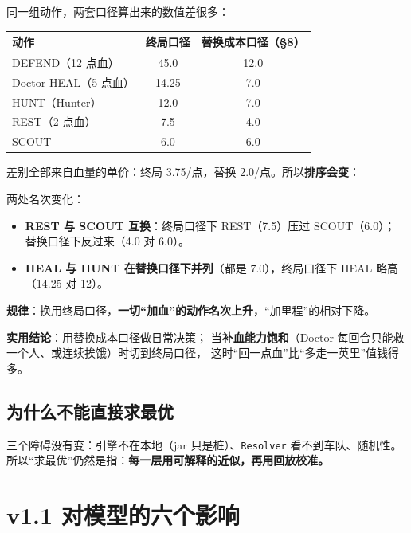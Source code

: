 \documentclass[UTF8,11pt,a4paper]{ctexart}
\begin{document}
\begin{warnbox}[title={口径不同，绝对值不同，排序也会变}]
同一组动作，两套口径算出来的数值差很多：

\begin{center}
\small
\begin{tabular}{@{}lcc@{}}
\toprule
\textbf{动作} & \textbf{终局口径} & \textbf{替换成本口径（§8）} \\
\midrule
DEFEND（12 点血） & 45.0 & 12.0 \\
Doctor HEAL（5 点血） & 14.25 & 7.0 \\
HUNT（Hunter） & 12.0 & 7.0 \\
REST（2 点血） & 7.5 & 4.0 \\
SCOUT & 6.0 & 6.0 \\
\bottomrule
\end{tabular}
\end{center}

\noindent 差别全部来自血量的单价：终局 3.75/点，替换 2.0/点。所以\textbf{排序会变}：

\noindent 两处名次变化：
\begin{itemize}[leftmargin=1.4em]
  \item \textbf{REST 与 SCOUT 互换}：终局口径下 REST（7.5）压过 SCOUT（6.0）；
        替换口径下反过来（4.0 对 6.0）。
  \item \textbf{HEAL 与 HUNT 在替换口径下并列}（都是 7.0），终局口径下 HEAL 略高（14.25 对 12）。
\end{itemize}
\textbf{规律}：换用终局口径，\textbf{一切“加血”的动作名次上升}，“加里程”的相对下降。

\textbf{实用结论}：用替换成本口径做日常决策；
当\textbf{补血能力饱和}（Doctor 每回合只能救一个人、或连续挨饿）时切到终局口径，
这时“回一点血”比“多走一英里”值钱得多。
\end{warnbox}

\subsection{为什么不能直接求最优}

三个障碍没有变：引擎不在本地（jar 只是桩）、\texttt{Resolver} 看不到车队、随机性。
所以“求最优”仍然是指：\textbf{每一层用可解释的近似，再用回放校准。}

\section{v1.1 对模型的六个影响}
\end{document}
